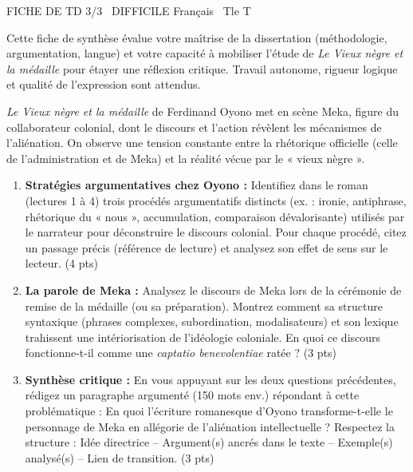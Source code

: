 \documentclass[11pt]{article}
\begin{document}
\pagestyle{empty}
\setlength{\parindent}{0pt}
\setlength{\parskip}{4pt}

\begin{tcolorbox}[enhanced,colback=popink,colframe=popink,arc=10pt,boxrule=0pt,left=12pt,right=12pt,top=9pt,bottom=9pt]
{\color{white}\popxbold\small FICHE DE TD 3/3 \textbullet\ DIFFICILE \hfill Français \textbullet\ Tle T\par}
\end{tcolorbox}
\vspace{4pt}

\noindent Cette fiche de synthèse évalue votre maîtrise de la dissertation (méthodologie, argumentation, langue) et votre capacité à mobiliser l'étude de \textit{Le Vieux nègre et la médaille} pour étayer une réflexion critique. Travail autonome, rigueur logique et qualité de l'expression sont attendus.

\begin{exercice}
\textit{Le Vieux nègre et la médaille} de Ferdinand Oyono met en scène Meka, figure du collaborateur colonial, dont le discours et l'action révèlent les mécanismes de l'aliénation. On observe une tension constante entre la rhétorique officielle (celle de l'administration et de Meka) et la réalité vécue par le « vieux nègre ».

\begin{enumerate}
    \item \textbf{Stratégies argumentatives chez Oyono :} Identifiez dans le roman (lectures 1 à 4) trois procédés argumentatifs distincts (ex. : ironie, antiphrase, rhétorique du « nous », accumulation, comparaison dévalorisante) utilisés par le narrateur pour déconstruire le discours colonial. Pour chaque procédé, citez un passage précis (référence de lecture) et analysez son effet de sens sur le lecteur. (4 pts)
    \item \textbf{La parole de Meka :} Analysez le discours de Meka lors de la cérémonie de remise de la médaille (ou sa préparation). Montrez comment sa structure syntaxique (phrases complexes, subordination, modalisateurs) et son lexique trahissent une intériorisation de l'idéologie coloniale. En quoi ce discours fonctionne-t-il comme une \textit{captatio benevolentiae} ratée ? (3 pts)
    \item \textbf{Synthèse critique :} En vous appuyant sur les deux questions précédentes, rédigez un paragraphe argumenté (150 mots env.) répondant à cette problématique : \og En quoi l'écriture romanesque d'Oyono transforme-t-elle le personnage de Meka en allégorie de l'aliénation intellectuelle ? \fg Respectez la structure : Idée directrice -- Argument(s) ancrés dans le texte -- Exemple(s) analysé(s) -- Lien de transition. (3 pts)
\end{enumerate}
\end{exercice}
\end{document}
